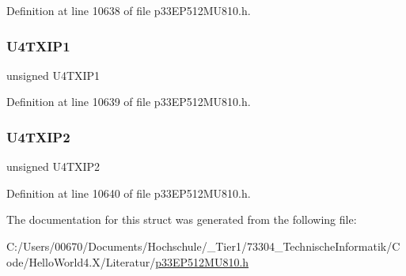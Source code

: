 Definition at line 10638 of file p33\+E\+P512\+M\+U810.\+h.

\mbox{\label{structtag_i_p_c22_b_i_t_s_a0818894982fdd0ef5b71a633006c59a1}} 
\subsubsection{\texorpdfstring{U4\+T\+X\+I\+P1}{U4TXIP1}}
{\footnotesize\ttfamily unsigned U4\+T\+X\+I\+P1}



Definition at line 10639 of file p33\+E\+P512\+M\+U810.\+h.

\mbox{\label{structtag_i_p_c22_b_i_t_s_af0e3e8902eb98b10e5a62a28d39ac00f}} 
\subsubsection{\texorpdfstring{U4\+T\+X\+I\+P2}{U4TXIP2}}
{\footnotesize\ttfamily unsigned U4\+T\+X\+I\+P2}



Definition at line 10640 of file p33\+E\+P512\+M\+U810.\+h.



The documentation for this struct was generated from the following file\+:\begin{DoxyCompactItemize}
\item 
C\+:/\+Users/00670/\+Documents/\+Hochschule/\+\_\+\+Tier1/73304\+\_\+\+Technische\+Informatik/\+Code/\+Hello\+World4.\+X/\+Literatur/\hyperlink{p33_e_p512_m_u810_8h}{p33\+E\+P512\+M\+U810.\+h}\end{DoxyCompactItemize}
